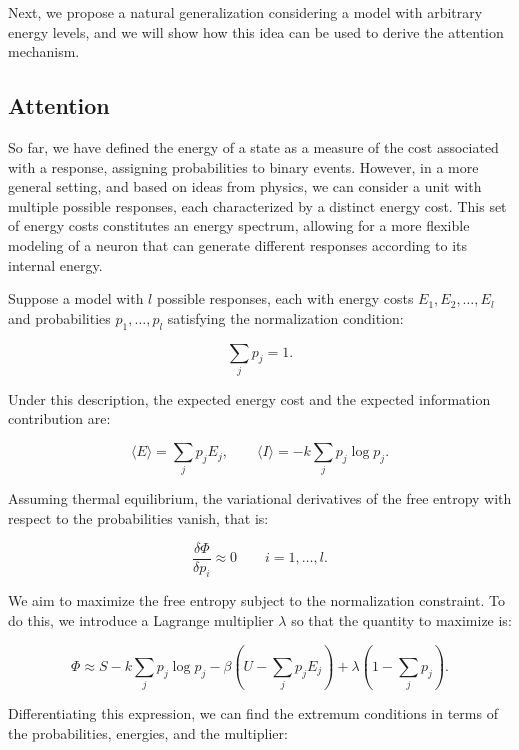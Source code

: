 \documentclass[12pt]{article}
\begin{document}
Next, we propose a natural generalization considering a model with arbitrary energy levels, and we will show how this idea can be used to derive the attention mechanism.
\subsection*{Attention}

So far, we have defined the energy of a state as a measure of the cost associated with a response, assigning probabilities to binary events. However, in a more general setting, and based on ideas from physics, we can consider a unit with multiple possible responses, each characterized by a distinct energy cost. This set of energy costs constitutes an energy spectrum, allowing for a more flexible modeling of a neuron that can generate different responses according to its internal energy.

Suppose a model with $l$ possible responses, each with energy costs $E_1, E_2, \dots, E_l$ and probabilities $p_1, \dots, p_l$ satisfying the normalization condition:

\begin{equation}
\sum_j p_j = 1.
\end{equation}

Under this description, the expected energy cost and the expected information contribution are:

\begin{equation}
\langle E \rangle = \sum_j p_j E_j, \qquad  
\langle I \rangle = -k \sum_j p_j \log p_j.
\end{equation}

Assuming thermal equilibrium, the variational derivatives of the free entropy with respect to the probabilities vanish, that is:

\begin{equation}
\frac{\delta \Phi}{\delta p_i} \approx 0 \qquad i = 1, \dots, l  .
\end{equation}

We aim to maximize the free entropy subject to the normalization constraint. To do this, we introduce a Lagrange multiplier $\lambda$ so that the quantity to maximize is:

\begin{equation}
\Phi \approx S - k \sum_j p_j \log p_j - \beta \left(U - \sum_j p_j E_j \right) + \lambda \left(1 - \sum_j p_j \right).
\end{equation}

Differentiating this expression, we can find the extremum conditions in terms of the probabilities, energies, and the multiplier:
\end{document}
